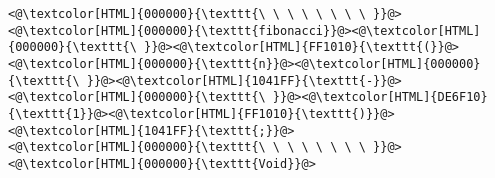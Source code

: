 \begin{lstlisting}
<@\textcolor[HTML]{000000}{\texttt{\ \ \ \ \ \ \ \ }}@><@\textcolor[HTML]{000000}{\texttt{fibonacci}}@><@\textcolor[HTML]{000000}{\texttt{\ }}@><@\textcolor[HTML]{FF1010}{\texttt{(}}@><@\textcolor[HTML]{000000}{\texttt{n}}@><@\textcolor[HTML]{000000}{\texttt{\ }}@><@\textcolor[HTML]{1041FF}{\texttt{-}}@><@\textcolor[HTML]{000000}{\texttt{\ }}@><@\textcolor[HTML]{DE6F10}{\texttt{1}}@><@\textcolor[HTML]{FF1010}{\texttt{)}}@><@\textcolor[HTML]{1041FF}{\texttt{;}}@>
<@\textcolor[HTML]{000000}{\texttt{\ \ \ \ \ \ \ \ }}@><@\textcolor[HTML]{000000}{\texttt{Void}}@>

\end{lstlisting}
